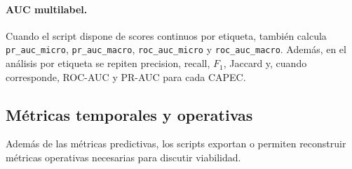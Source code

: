\documentclass[12pt,oneside]{report}
\begin{document}
\paragraph{AUC multilabel.}
Cuando el script dispone de scores continuos por etiqueta, también calcula \texttt{pr\_auc\_micro}, \texttt{pr\_auc\_macro}, \texttt{roc\_auc\_micro} y \texttt{roc\_auc\_macro}. Además, en el análisis por etiqueta se repiten precision, recall, $F_1$, Jaccard y, cuando corresponde, ROC-AUC y PR-AUC para cada CAPEC.

\subsection{Métricas temporales y operativas}
Además de las métricas predictivas, los scripts exportan o permiten reconstruir métricas operativas necesarias para discutir viabilidad.
\end{document}
